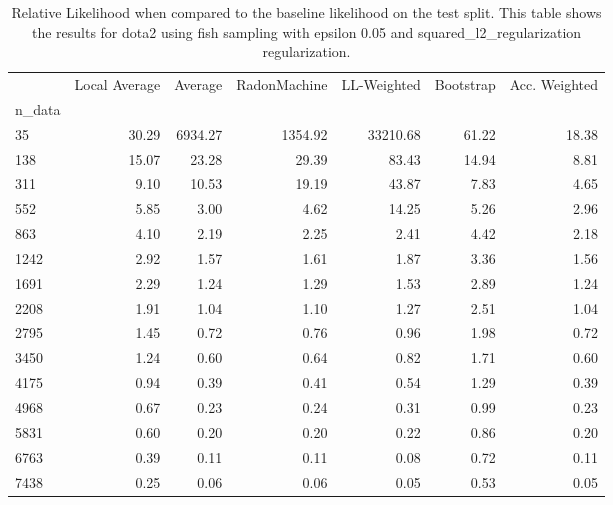 \begin{table}
\centering
\caption{Relative Likelihood when compared to the baseline likelihood on the test split. This table shows the results for  dota2 using  fish sampling with epsilon  0.05 and  squared_l2_regularization regularization.}
\label{tab:11}
\begin{tabular}{lrrrrrr}
\toprule
{} &  Local Average &  Average &  RadonMachine &  LL-Weighted &  Bootstrap &  Acc. Weighted \\
n\_data &                &          &               &              &            &                \\
\midrule
35     &          30.29 &  6934.27 &       1354.92 &     33210.68 &      61.22 &          18.38 \\
138    &          15.07 &    23.28 &         29.39 &        83.43 &      14.94 &           8.81 \\
311    &           9.10 &    10.53 &         19.19 &        43.87 &       7.83 &           4.65 \\
552    &           5.85 &     3.00 &          4.62 &        14.25 &       5.26 &           2.96 \\
863    &           4.10 &     2.19 &          2.25 &         2.41 &       4.42 &           2.18 \\
1242   &           2.92 &     1.57 &          1.61 &         1.87 &       3.36 &           1.56 \\
1691   &           2.29 &     1.24 &          1.29 &         1.53 &       2.89 &           1.24 \\
2208   &           1.91 &     1.04 &          1.10 &         1.27 &       2.51 &           1.04 \\
2795   &           1.45 &     0.72 &          0.76 &         0.96 &       1.98 &           0.72 \\
3450   &           1.24 &     0.60 &          0.64 &         0.82 &       1.71 &           0.60 \\
4175   &           0.94 &     0.39 &          0.41 &         0.54 &       1.29 &           0.39 \\
4968   &           0.67 &     0.23 &          0.24 &         0.31 &       0.99 &           0.23 \\
5831   &           0.60 &     0.20 &          0.20 &         0.22 &       0.86 &           0.20 \\
6763   &           0.39 &     0.11 &          0.11 &         0.08 &       0.72 &           0.11 \\
7438   &           0.25 &     0.06 &          0.06 &         0.05 &       0.53 &           0.05 \\
\bottomrule
\end{tabular}
\end{table}
